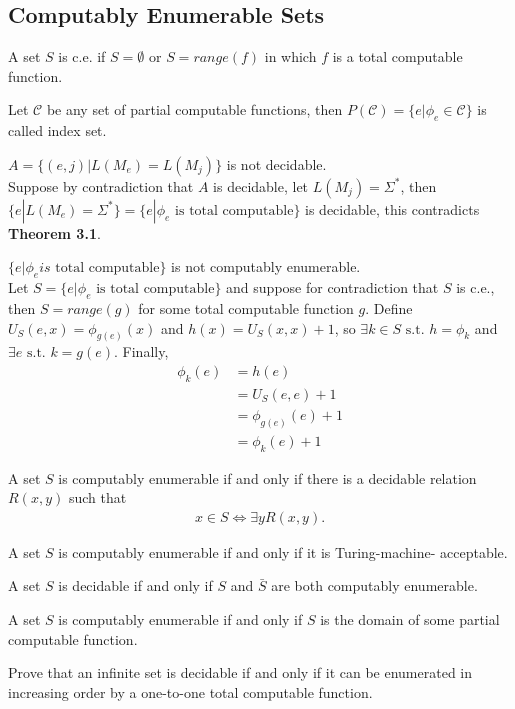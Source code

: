 \subsection{Computably Enumerable Sets}
 A set $S$ is c.e. if $S=\emptyset$ or
$S=range(f)$ in which $f$ is a total computable function.

 Let $\mathscr{C}$ be any set of partial computable functions,
then $P(\mathscr{C})=\{e|\phi_e \in \mathscr{C}\}$ is called index set.

 $A=\{(e,j)|L(M_e) = L(M_j)\}$ is not decidable.\\
Suppose by contradiction that $A$ is decidable, let $L(M_j)=\Sigma^*$, then
$\{e|L(M_e)=\Sigma^*\}=\{e|\phi_e \text{ is total computable}\}$ is decidable,
this contradicts \textbf{Theorem 3.1}.

 $\{e | \phi_e is \text{ total computable}\}$ is not
computably enumerable.\\
Let $S=\{e|\phi_e \text{ is total computable}\}$ and suppose for contradiction
that $S$ is c.e., then $S=range(g)$ for some total computable function $g$.
Define $U_S(e,x)=\phi_{g(e)}(x)$ and $h(x)=U_S(x,x)+1$, so $\exists k \in S
\text{ s.t. } h=\phi_k$ and $\exists e \text{ s.t. } k=g(e)$.
Finally,
\begin{align*}
  \phi_k(e)&=h(e)\\
  &=U_S(e,e)+1 \\
  &=\phi_{g(e)}(e)+1\\
  &=\phi_k(e)+1
\end{align*}

 A set $S$ is computably enumerable if and only if there is a
decidable
relation $R(x, y)$ such that
\begin{align*}
x \in S \Leftrightarrow \exists y R(x, y).
\end{align*}

 A set $S$ is computably enumerable if and only if it is
Turing-machine-
acceptable.

 A set $S$ is decidable if and only if $S$ and $\bar{S}$ are both
computably
enumerable.

 A set $S$ is computably enumerable if and only if $S$ is the
domain of
some partial computable function.

 Prove that an infinite set is decidable if and only if it can
be
enumerated in increasing order by a one-to-one total computable function.

